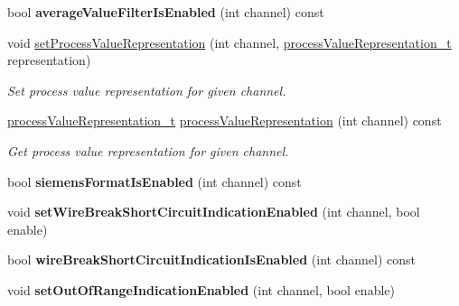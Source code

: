 \begin{DoxyCompactItemize}
\item 
\hypertarget{classmdt_device_modbus_wago_module_rtd_a2ea9a2eeb55e1ef943d951bffc49f163}{
bool {\bfseries averageValueFilterIsEnabled} (int channel) const }
\label{classmdt_device_modbus_wago_module_rtd_a2ea9a2eeb55e1ef943d951bffc49f163}

\item 
void \hyperlink{classmdt_device_modbus_wago_module_rtd_a012c6438f55b5653c7320dbe477d93b5}{setProcessValueRepresentation} (int channel, \hyperlink{classmdt_device_modbus_wago_module_rtd_a6edcc72b85641ca88d66ca45a7650ca8}{processValueRepresentation\_\-t} representation)
\begin{DoxyCompactList}\small\item\em Set process value representation for given channel. \end{DoxyCompactList}\item 
\hyperlink{classmdt_device_modbus_wago_module_rtd_a6edcc72b85641ca88d66ca45a7650ca8}{processValueRepresentation\_\-t} \hyperlink{classmdt_device_modbus_wago_module_rtd_af84714e285705c3ef3415648892beae7}{processValueRepresentation} (int channel) const 
\begin{DoxyCompactList}\small\item\em Get process value representation for given channel. \end{DoxyCompactList}\item 
\hypertarget{classmdt_device_modbus_wago_module_rtd_a0815ffe86f6c8c1a437af2b87f14ea60}{
bool {\bfseries siemensFormatIsEnabled} (int channel) const }
\label{classmdt_device_modbus_wago_module_rtd_a0815ffe86f6c8c1a437af2b87f14ea60}

\item 
\hypertarget{classmdt_device_modbus_wago_module_rtd_a5562d06610347baae6a9e6b639142d80}{
void {\bfseries setWireBreakShortCircuitIndicationEnabled} (int channel, bool enable)}
\label{classmdt_device_modbus_wago_module_rtd_a5562d06610347baae6a9e6b639142d80}

\item 
\hypertarget{classmdt_device_modbus_wago_module_rtd_a01ed3710a2f7a22a686fa06fd747219a}{
bool {\bfseries wireBreakShortCircuitIndicationIsEnabled} (int channel) const }
\label{classmdt_device_modbus_wago_module_rtd_a01ed3710a2f7a22a686fa06fd747219a}

\item 
\hypertarget{classmdt_device_modbus_wago_module_rtd_a0ff6dacdf0f7b4b079e46f51341822d9}{
void {\bfseries setOutOfRangeIndicationEnabled} (int channel, bool enable)}
\label{classmdt_device_modbus_wago_module_rtd_a0ff6dacdf0f7b4b079e46f51341822d9}


\end{DoxyCompactItemize}
